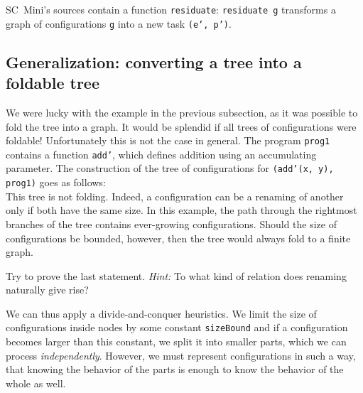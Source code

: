 \begin{exercise}
SC~Mini's sources contain a function \texttt{residuate}: \texttt{residuate g} transforms
a graph of configurations \texttt{g} into a new task \texttt{(e',~p')}.
\end{exercise}

\subsection{Generalization: converting a tree into a foldable tree}

We were lucky with the example in the previous subsection, as it was possible to fold the tree into a graph.
It would be splendid if all trees of configurations were foldable! 
Unfortunately this is not the case in general.
The program \texttt{prog1} contains a function \texttt{add'}, which defines
addition using an accumulating parameter.
The construction of the tree of configurations for \texttt{(add'(x, y), prog1)} goes as follows:\\


This tree is not folding.
Indeed, a configuration can be a renaming of another only if both have the same size.
In this example, the path through the rightmost branches of the tree
contains ever-growing configurations.
Should the size of configurations be bounded, however, then the tree
would always fold to a finite graph.
\begin{exercise}
Try to prove the last statement. \textit{Hint:} To what kind of relation does
renaming naturally give rise?
\end{exercise}


We can thus apply a divide-and-conquer heuristics. 
We limit the size of configurations inside nodes by some constant \texttt{sizeBound}
and if a configuration becomes larger than this constant,
we split it into smaller parts, which we can process \emph{independently}.
However, we must
represent configurations in such a way, that knowing the behavior of the parts
is enough to know the behavior of the whole as well.

